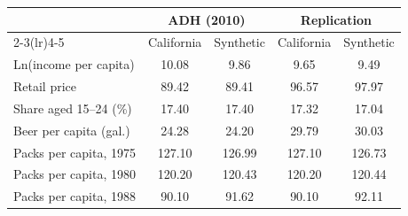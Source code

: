 \begin{tabular}{lcccc}
\toprule
 & \multicolumn{2}{c}{ADH (2010)} & \multicolumn{2}{c}{Replication} \\
\cmidrule(lr){2-3}\cmidrule(lr){4-5}
 & California & Synthetic & California & Synthetic \\
\midrule
Ln(income per capita) & 10.08 & 9.86 & 9.65 & 9.49 \\
Retail price & 89.42 & 89.41 & 96.57 & 97.97 \\
Share aged 15--24 (\%) & 17.40 & 17.40 & 17.32 & 17.04 \\
Beer per capita (gal.) & 24.28 & 24.20 & 29.79 & 30.03 \\
Packs per capita, 1975 & 127.10 & 126.99 & 127.10 & 126.73 \\
Packs per capita, 1980 & 120.20 & 120.43 & 120.20 & 120.44 \\
Packs per capita, 1988 & 90.10 & 91.62 & 90.10 & 92.11 \\
\bottomrule
\end{tabular}
